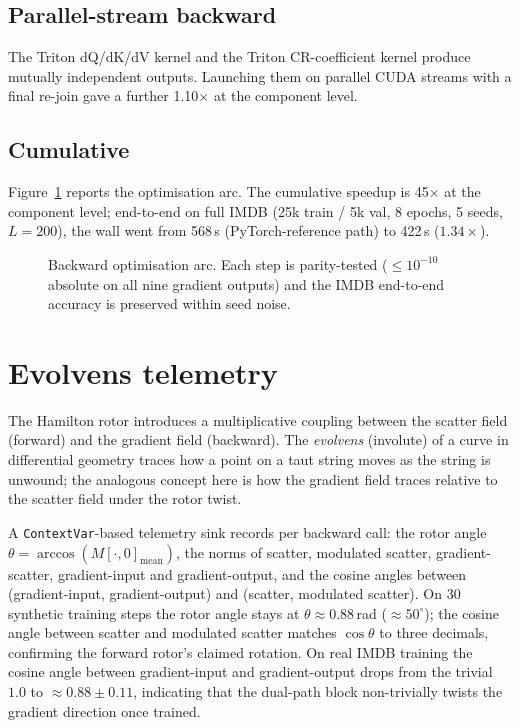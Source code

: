 \documentclass[11pt, a4paper]{article}
\begin{document}
\subsection{Parallel-stream backward}

The Triton dQ/dK/dV kernel and the Triton CR-coefficient kernel produce
mutually independent outputs. Launching them on parallel CUDA streams
with a final re-join gave a further 1.10$\times$ at the component level.

\subsection{Cumulative}

Figure~\ref{fig:opt-arc} reports the optimisation arc. The cumulative
speedup is 45$\times$ at the component level; end-to-end on full IMDB
(25k train / 5k val, 8 epochs, 5 seeds, $L = 200$), the wall went from
568\,s (PyTorch-reference path) to 422\,s ($1.34\times$).

\begin{figure}[t]
  \centering
  
  \caption{Backward optimisation arc. Each step is parity-tested
  ($\leq 10^{-10}$ absolute on all nine gradient outputs) and the
  IMDB end-to-end accuracy is preserved within seed noise.}
  \label{fig:opt-arc}
\end{figure}

\section{Evolvens telemetry}
\label{sec:telem}

The Hamilton rotor introduces a multiplicative coupling between the
scatter field (forward) and the gradient field (backward). The
\emph{evolvens} (involute) of a curve in differential geometry traces
how a point on a taut string moves as the string is unwound; the
analogous concept here is how the gradient field traces relative to
the scatter field under the rotor twist.

A \texttt{ContextVar}-based telemetry sink records per backward call:
the rotor angle $\theta = \arccos(M[\cdot, 0]_{\text{mean}})$, the
norms of scatter, modulated scatter, gradient-scatter, gradient-input
and gradient-output, and the cosine angles between (gradient-input,
gradient-output) and (scatter, modulated scatter). On 30 synthetic
training steps the rotor angle stays at $\theta \approx 0.88$\,rad
($\approx 50^\circ$); the cosine angle between scatter and modulated
scatter matches $\cos\theta$ to three decimals, confirming the forward
rotor's claimed rotation. On real IMDB training the cosine angle
between gradient-input and gradient-output drops from the trivial
$1.0$ to $\approx 0.88 \pm 0.11$, indicating that the dual-path block
non-trivially twists the gradient direction once trained.
\end{document}
